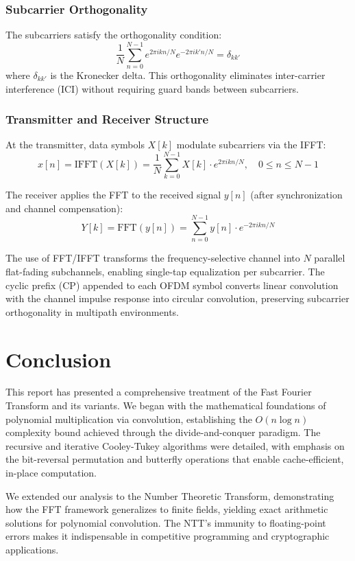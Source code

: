 \documentclass[a4paper]{article}
\theoremstyle{definition}
\begin{document}
\subsubsection{Subcarrier Orthogonality}

The subcarriers satisfy the orthogonality condition:
\[
\frac{1}{N} \sum_{n=0}^{N-1} e^{2\pi i k n / N} e^{-2\pi i k' n / N} = \delta_{kk'}
\]
where $\delta_{kk'}$ is the Kronecker delta. This orthogonality eliminates inter-carrier interference (ICI) without requiring guard bands between subcarriers.

\subsubsection{Transmitter and Receiver Structure}

At the transmitter, data symbols $X[k]$ modulate subcarriers via the IFFT:
\[
x[n] = \text{IFFT}(X[k]) = \frac{1}{N} \sum_{k=0}^{N-1} X[k] \cdot e^{2\pi i kn / N}, \quad 0 \leq n \leq N-1
\]

The receiver applies the FFT to the received signal $y[n]$ (after synchronization and channel compensation):
\[
Y[k] = \text{FFT}(y[n]) = \sum_{n=0}^{N-1} y[n] \cdot e^{-2\pi i kn / N}
\]

The use of FFT/IFFT transforms the frequency-selective channel into $N$ parallel flat-fading subchannels, enabling single-tap equalization per subcarrier. The cyclic prefix (CP) appended to each OFDM symbol converts linear convolution with the channel impulse response into circular convolution, preserving subcarrier orthogonality in multipath environments. 

\section{Conclusion}

This report has presented a comprehensive treatment of the Fast Fourier Transform and its variants. We began with the mathematical foundations of polynomial multiplication via convolution, establishing the $O(n \log n)$ complexity bound achieved through the divide-and-conquer paradigm. The recursive and iterative Cooley-Tukey algorithms were detailed, with emphasis on the bit-reversal permutation and butterfly operations that enable cache-efficient, in-place computation.

We extended our analysis to the Number Theoretic Transform, demonstrating how the FFT framework generalizes to finite fields, yielding exact arithmetic solutions for polynomial convolution. The NTT's immunity to floating-point errors makes it indispensable in competitive programming and cryptographic applications.
\end{document}
